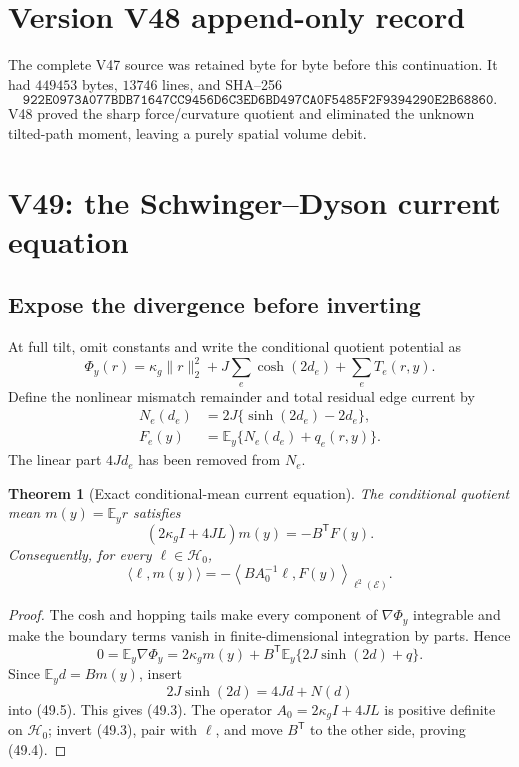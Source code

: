 \documentclass[11pt]{article}
\newtheorem{theorem}{Theorem}[section]
\theoremstyle{remark}
\begin{document}
\section*{Version V48 append-only record}
The complete V47 source was retained byte for byte before this
continuation.  It had \(449453\) bytes, \(13746\) lines, and SHA--256
\[
 \texttt{922E0973A077BDB71647CC9456D6C3ED6BD497CA0F5485F2F9394290E2B68860}.
\]
V48 proved the sharp force/curvature quotient and eliminated the
unknown tilted-path moment, leaving a purely spatial volume debit.


\section{V49: the Schwinger--Dyson current equation}
\label{sec:v17v49}

\subsection{Expose the divergence before inverting}

At full tilt, omit constants and write the conditional quotient
potential as
\[
 \Phi_y(r)=
 \kappa_g\|r\|_2^2+
 J\sum_e\cosh(2d_e)+
 \sum_eT_e(r,y).                                  \tag{49.1}
\]
Define the nonlinear mismatch remainder and total residual edge
current by
\[
\begin{aligned}
 N_e(d_e)&=2J\{\sinh(2d_e)-2d_e\},\\
 F_e(y)&=\mathbb E_y\{N_e(d_e)+q_e(r,y)\}.         \tag{49.2}
\end{aligned}
\]
The linear part \(4Jd_e\) has been removed from \(N_e\).

\begin{theorem}[Exact conditional-mean current equation]
\label{thm:v17v49-current}
The conditional quotient mean \(m(y)=\mathbb E_y r\) satisfies
\[
\boxed{
 (2\kappa_gI+4JL)m(y)
 =
 -B^{\mathsf T}F(y).}                             \tag{49.3}
\]
Consequently, for every \(\ell\in\mathcal H_0\),
\[
\boxed{
 \langle\ell,m(y)\rangle
 =
 -\left\langle
 BA_0^{-1}\ell,F(y)
 \right\rangle_{\ell^2(\mathcal E)}.}             \tag{49.4}
\]
\end{theorem}

\begin{proof}
The cosh and hopping tails make every component of
\(\nabla\Phi_y\) integrable and make the boundary terms vanish in
finite-dimensional integration by parts.  Hence
\[
 0=\mathbb E_y\nabla\Phi_y
 =
 2\kappa_gm(y)+
 B^{\mathsf T}\mathbb E_y
 \{2J\sinh(2d)+q\}.                               \tag{49.5}
\]
Since \(\mathbb E_y d=Bm(y)\), insert
\[
 2J\sinh(2d)=4Jd+N(d)
\]
into (49.5).  This gives (49.3).  The operator
\(A_0=2\kappa_gI+4JL\) is positive definite on
\(\mathcal H_0\); invert (49.3), pair with \(\ell\), and move
\(B^{\mathsf T}\) to the other side, proving (49.4).
\end{proof}
\end{document}
